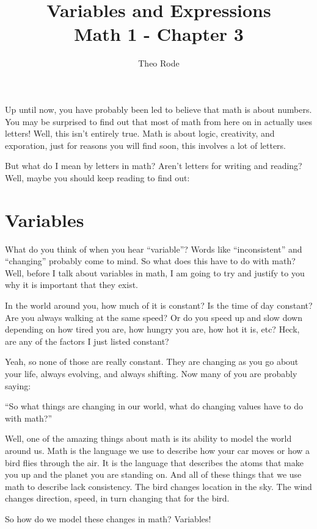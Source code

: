 \documentclass{article}
\title{\textbf{Variables and Expressions} \\ \large Math 1 - Chapter 3}
\author{Theo Rode}
\date{}
\begin{document}
\maketitle

Up until now, you have probably been led to believe that math is about numbers. You may be surprised to find out that most of math from here on in actually uses letters! 
Well, this isn't entirely true. Math is about logic, creativity, and exporation, just for reasons you will find soon, this involves a lot of letters. 

But what do I mean by letters in math? Aren't letters for writing and reading? Well, maybe you should keep reading to find out:

\section*{Variables}

What do you think of when you hear ``variable''? Words like ``inconsistent'' and ``changing'' probably come to mind. So what does this have to do with math? 
Well, before I talk about variables in math, I am going to try and justify to you why it is important that they exist. 

In the world around you, how much of it is constant? Is the time of day constant? Are you always walking at the same speed? Or do you speed up and slow down depending on how tired you are, how hungry you are, how hot it is, etc? Heck, are any of the factors I just listed constant? 

Yeah, so none of those are really constant. They are changing as you go about your life, always evolving, and always shifting. Now many of you are probably saying: 
\begin{center}
    ``So what things are changing in our world, what do changing values have to do with math?''
\end{center}

Well, one of the amazing things about math is its ability to model the world around us. Math is the language we use to describe how your car moves or how a bird flies through the air. It is the language that describes the atoms that make you up and the planet you are standing on. And all of these things that we use math to describe lack consistency. The bird changes location in the sky. The wind changes direction, speed, in turn changing that for the bird. 

So how do we model these changes in math? Variables! 
\end{document}
